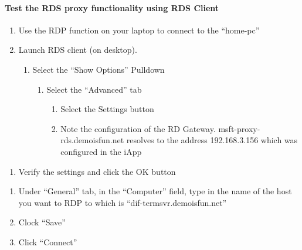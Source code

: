 \documentclass[letterpaper,10pt,english]{sphinxmanual}
\begin{document}
\paragraph{Test the RDS proxy functionality using RDS Client}
\label{\detokenize{class2/module3/lab1:test-the-rds-proxy-functionality-using-rds-client}}\begin{enumerate}
\item {} 
Use the RDP function on your laptop to connect to the “home-pc”

\item {} 
Launch RDS client (on desktop).
\begin{enumerate}
\item {} 
Select the “Show Options” Pulldown
\begin{enumerate}
\item {} 
Select the “Advanced” tab
\begin{enumerate}
\item {} 
Select the Settings button

\item {} 
Note the configuration of the RD Gateway.
msft-proxy-rds.demoisfun.net resolves to the address
192.168.3.156 which was configured in the iApp

\end{enumerate}

\end{enumerate}

\end{enumerate}
\begin{quote}

\end{quote}

\end{enumerate}
\begin{enumerate}
\item {} 
Verify the settings and click the OK button

\end{enumerate}
\begin{enumerate}
\item {} 
Under “General” tab, in the “Computer” field, type in the name of
the host you want to RDP to which is “dif-termsvr.demoisfun.net”


\item {} 
Clock “Save”

\item {} 
Click “Connect”

\end{enumerate}
\end{document}

